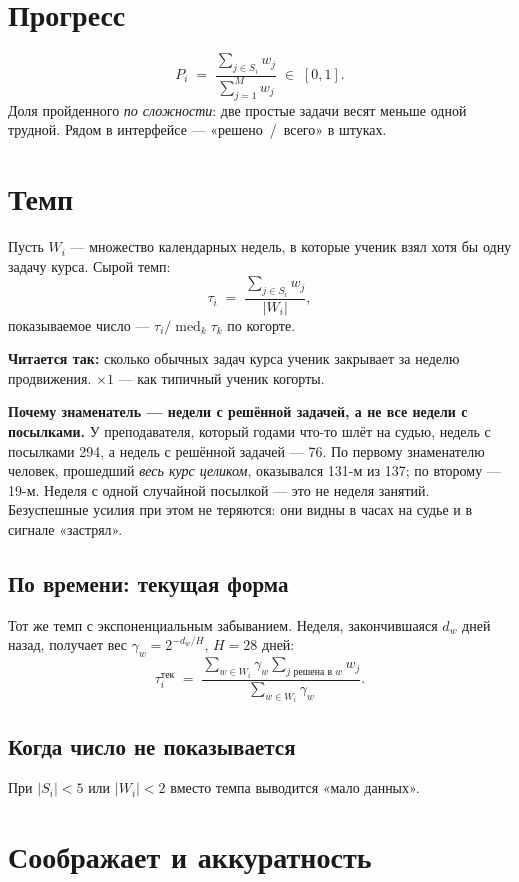 \documentclass[11pt,a4paper]{article}
\newcommand{\med}{\operatorname{med}}
\begin{document}
\section{Прогресс}

\[
  P_i \;=\; \frac{\sum_{j \in S_i} w_j}{\sum_{j=1}^{M} w_j} \;\in\; [0,1].
\]
Доля пройденного \emph{по сложности}: две простые задачи весят меньше одной
трудной. Рядом в интерфейсе --- «решено~/~всего» в штуках.

\section{Темп}

Пусть $W_i$ --- множество календарных недель, в которые ученик взял хотя бы
одну задачу курса. Сырой темп:
\[
  \tau_i \;=\; \frac{\sum_{j \in S_i} w_j}{|W_i|},
\]
показываемое число --- $\tau_i / \med_k \tau_k$ по когорте.

\textbf{Читается так:} сколько обычных задач курса ученик закрывает за неделю
продвижения. $\times 1$ --- как типичный ученик когорты.

\textbf{Почему знаменатель --- недели с решённой задачей, а не все недели с
посылками.} У преподавателя, который годами что-то шлёт на судью, недель с
посылками 294, а недель с решённой задачей --- 76. По первому знаменателю
человек, прошедший \emph{весь курс целиком}, оказывался 131-м из 137; по
второму --- 19-м. Неделя с одной случайной посылкой --- это не неделя занятий.
Безуспешные усилия при этом не теряются: они видны в часах на судье и в сигнале
«застрял».

\subsection*{По времени: текущая форма}

Тот же темп с экспоненциальным забыванием. Неделя, закончившаяся $d_w$ дней
назад, получает вес $\gamma_w = 2^{-d_w/H}$, $H = 28$ дней:
\[
  \tau_i^{\text{тек}} \;=\;
  \frac{\sum_{w \in W_i} \gamma_w \sum_{j \text{ решена в } w} w_j}
       {\sum_{w \in W_i} \gamma_w}.
\]

\subsection*{Когда число не показывается}

При $|S_i| < 5$ или $|W_i| < 2$ вместо темпа выводится «мало данных».

\section{Соображает и аккуратность}\label{sec:mind}
\end{document}
